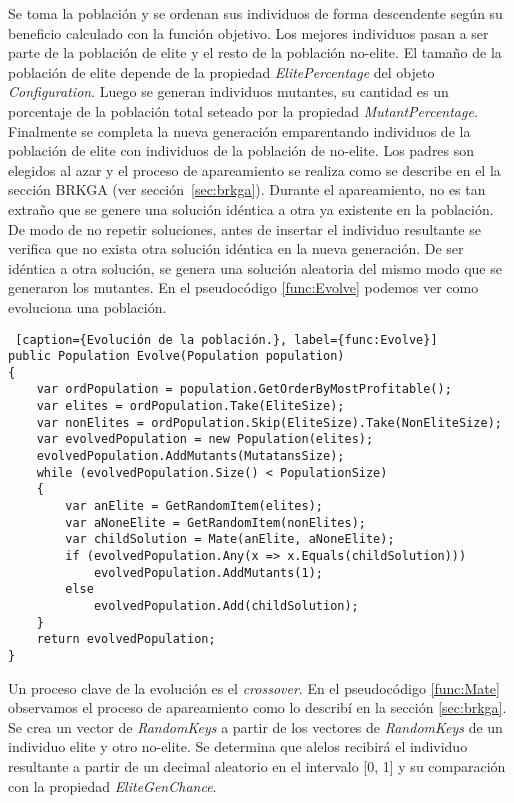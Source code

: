 Se toma la población y se ordenan sus individuos de forma descendente según su beneficio calculado con la función objetivo. Los mejores individuos pasan a ser parte de la población de elite y el resto de la población no-elite. El tamaño de la población de elite depende de la propiedad \textit{ElitePercentage} del objeto \textit{Configuration}. Luego se generan individuos mutantes, su cantidad es un porcentaje de la población total seteado por la propiedad \textit{MutantPercentage}. Finalmente se completa la nueva generación emparentando individuos de la población de elite con individuos de la población de no-elite. Los padres son elegidos al azar y el proceso de apareamiento se realiza como se describe en el la sección BRKGA (ver sección~\ref{sec:brkga}). Durante el apareamiento, no es tan extraño que se genere una solución idéntica a otra ya existente en la población. De modo de no repetir soluciones, antes de insertar el individuo resultante se verifica que no exista otra solución idéntica en la nueva generación. De ser idéntica a otra solución, se genera una solución aleatoria del mismo modo que se generaron los mutantes. En el pseudocódigo \ref{func:Evolve} podemos ver como evoluciona una población.

\bigskip

\begin{minipage}{\textwidth}
\begin{lstlisting} [caption={Evolución de la población.}, label={func:Evolve}]
public Population Evolve(Population population)
{
	var ordPopulation = population.GetOrderByMostProfitable();
	var elites = ordPopulation.Take(EliteSize);
	var nonElites = ordPopulation.Skip(EliteSize).Take(NonEliteSize);
	var evolvedPopulation = new Population(elites);
	evolvedPopulation.AddMutants(MutatansSize);
	while (evolvedPopulation.Size() < PopulationSize)
	{
		var anElite = GetRandomItem(elites);
		var aNoneElite = GetRandomItem(nonElites);
		var childSolution = Mate(anElite, aNoneElite);
		if (evolvedPopulation.Any(x => x.Equals(childSolution)))
			evolvedPopulation.AddMutants(1);
		else
			evolvedPopulation.Add(childSolution);
	}
	return evolvedPopulation;
}
\end{lstlisting}
\end{minipage}

\bigskip

Un proceso clave de la evolución es el \textit{crossover}. En el pseudocódigo \ref{func:Mate} observamos el proceso de apareamiento como lo describí en la sección \ref{sec:brkga}. Se crea un vector de \textit{RandomKeys} a partir de los vectores de \textit{RandomKeys} de un individuo elite y otro no-elite. Se determina que alelos recibirá el individuo resultante a partir de un decimal aleatorio en el intervalo [0, 1] y su comparación con la propiedad \textit{EliteGenChance}.

